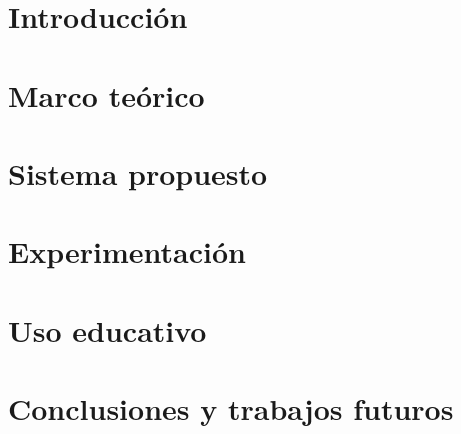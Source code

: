 \documentclass[11pt,a4paper,spanish]{book}
\begin{document}
\frontmatter








\tableofcontents
\listoffigures
\mainmatter

\chapter{Introducción}













\chapter{Marco teórico}

\label{marcoTeorico}











\chapter{Sistema propuesto}

\label{sistemaPropuesto}



\chapter{Experimentación}

\label{experimentacion}



\chapter{Uso educativo}

\label{usoEducativo}



\chapter{Conclusiones y trabajos futuros}

\label{conclucionesYTrabajosFuturos}






\end{document}
